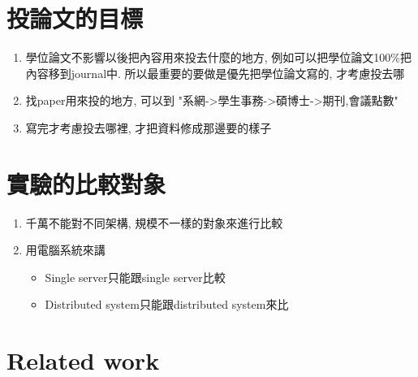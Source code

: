 \section{投論文的目標}

\begin{enumerate}
  \item
  {
    學位論文不影響以後把內容用來投去什麼的地方, 例如可以把學位論文100\%把內容移到journal中. 所以最重要的要做是優先把學位論文寫的, 才考慮投去哪
  } %

  \item
  {
    找paper用來投的地方, 可以到 "系網->學生事務->碩博士->期刊,會議點數"
  } %

  \item
  {
    寫完才考慮投去哪裡, 才把資料修成那邊要的樣子
  } %
\end{enumerate}

\section{實驗的比較對象}

\begin{enumerate}
  \item
  {
    千萬不能對不同架構, 規模不一樣的對象來進行比較
  } %

  \item
  {
    用電腦系統來講
    \begin{itemize}
      \item
      {
        Single server只能跟single server比較
      } %

      \item
      {
        Distributed system只能跟distributed system來比
      } %
    \end{itemize}
  } %
\end{enumerate}

\section{Related work}

